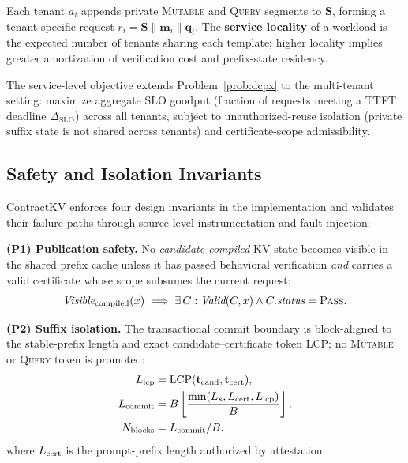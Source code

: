 \documentclass[journal]{IEEEtran}
\begin{document}
Each tenant $a_i$ appends private \textsc{Mutable} and \textsc{Query} segments to $\mathbf{S}$, forming a tenant-specific request $r_i = \mathbf{S} \| \mathbf{m}_i \| \mathbf{q}_i$. The \textbf{service locality} of a workload is the expected number of tenants sharing each template; higher locality implies greater amortization of verification cost and prefix-state residency.

The service-level objective extends Problem~\ref{prob:dcpx} to the multi-tenant setting: maximize aggregate SLO goodput (fraction of requests meeting a TTFT deadline $\Delta_{\text{SLO}}$) across all tenants, subject to unauthorized-reuse isolation (private suffix state is not shared across tenants) and certificate-scope admissibility.

\subsection{Safety and Isolation Invariants}

ContractKV enforces four design invariants in the implementation and validates their failure paths through source-level instrumentation and fault injection:

\smallskip
\noindent\textbf{(P1) Publication safety.}
No \emph{candidate compiled} KV state becomes visible in the shared prefix cache unless it has passed behavioral verification \emph{and} carries a valid certificate whose scope subsumes the current request:
\begin{equation}
  \textit{Visible}_{\rm compiled}(x) \implies \exists\, C: \textit{Valid}(C, x) \wedge C.\textit{status} = \textsc{Pass}.
\end{equation}

\noindent\textbf{(P2) Suffix isolation.}
The transactional commit boundary is block-aligned to the stable-prefix length and exact candidate--certificate token LCP; no \textsc{Mutable} or \textsc{Query} token is promoted:
\begin{equation}
\begin{aligned}
  L_{\rm lcp}&=\operatorname{LCP}(\mathbf{t}_{\rm cand},\mathbf{t}_{\rm cert}),\\
  L_{\rm commit}&=B\left\lfloor\frac{\min(L_s,L_{\rm cert},L_{\rm lcp})}{B}\right\rfloor,\\
  N_{\rm blocks}&=L_{\rm commit}/B.
\end{aligned}
\end{equation}
where $L_{\rm cert}$ is the prompt-prefix length authorized by attestation.
\end{document}
